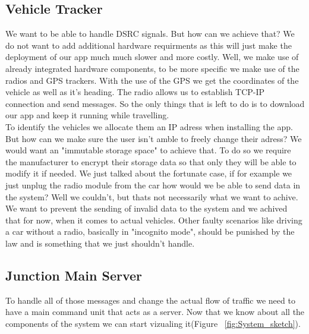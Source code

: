 \documentclass[17pt]{article}
\begin{document}
\subsection{Vehicle Tracker}
\indent \indent
We want to be able to handle DSRC signals. But how can we achieve that?
We do not want to add additional hardware requirments as this will just
make the deployment of our app much much slower and more costly. Well,
we make use of already integrated hardware components, to be more specific we 
make use of the radios and GPS trackers. With the use of the GPS we get the
coordinates of the vehicle as well as it's heading. The radio allows us to
establish TCP-IP connection and send messages. So the only things that is left to do
is to download our app and keep it running while travelling.\\
\indent \indent
To identify the vehicles we allocate them an IP adress when installing the app. But how can we
make sure the user isn't amble to freely change their adress? We would want an "immutable
storage space" to achieve that. To do so we require the manufacturer to encrypt their storage
data so that only they will be able to modify it if needed. We just talked about the fortunate
case, if for example we just unplug the radio module from the car how would we be able to send
data in the system? Well we couldn't, but thats not necessarily what we want to achive. We want
to prevent the sending of invalid data to the system and we achived that for now, when it comes
to actual vehicles. Other faulty scenarios like driving a car without a radio, basically in
"incognito mode", should be punished by the law and is something that we just shouldn't handle.

\pagebreak
\subsection{Junction Main Server}
\indent \indent
To handle all of those messages and change the actual flow of traffic we
need to have a main command unit that acts as a server. Now 
that we know about all the components of the system we can 
start vizualing it(Figure ~\ref{fig:System_sketch}).
\end{document}
